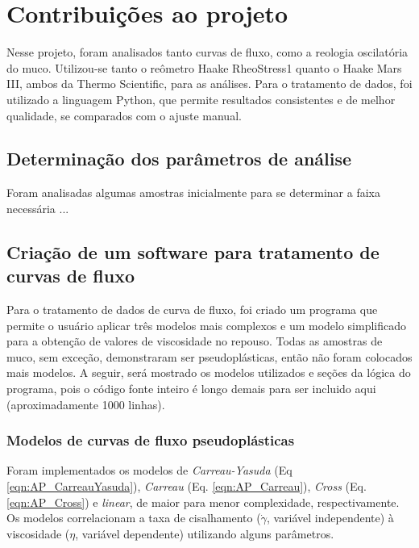 	\chapter{Contribuições ao projeto}
	
	Nesse projeto, foram analisados tanto curvas de fluxo, como a reologia oscilatória do muco. Utilizou-se tanto o reômetro Haake RheoStress1 quanto o Haake Mars III, ambos da Thermo Scientific, para as análises. Para o tratamento de dados, foi utilizado a linguagem Python, que permite resultados consistentes e de melhor qualidade, se comparados com o ajuste manual.
	
		\section{Determinação dos parâmetros de análise}
		
		Foram analisadas algumas amostras inicialmente para se determinar a faixa necessária ... %
	
		\section{Criação de um software para tratamento de curvas de fluxo}
		\label{sec:apn_tratamento_CF}
		Para o tratamento de dados de curva de fluxo, foi criado um programa que permite o usuário aplicar três modelos mais complexos e um modelo simplificado para a obtenção de valores de viscosidade no repouso. Todas as amostras de muco, sem exceção, demonstraram ser pseudoplásticas, então não foram colocados mais modelos. A seguir, será mostrado os modelos utilizados e seções da lógica do programa, pois o código fonte inteiro é longo demais para ser incluido aqui (aproximadamente 1000 linhas).
		
			\subsection{Modelos de curvas de fluxo pseudoplásticas}
			
		\label{sec:modelagem_curva_fluxo}
		Foram implementados os modelos de \emph{Carreau-Yasuda} (Eq \ref{eqn:AP_CarreauYasuda}), \emph{Carreau} (Eq. \ref{eqn:AP_Carreau}), \emph{Cross} (Eq. \ref{eqn:AP_Cross}) e \emph{linear}, de maior para menor complexidade, respectivamente. Os modelos correlacionam a taxa de cisalhamento (\(\dot{\gamma}\), variável independente) à viscosidade (\(\eta\), variável dependente) utilizando alguns parâmetros.
		
